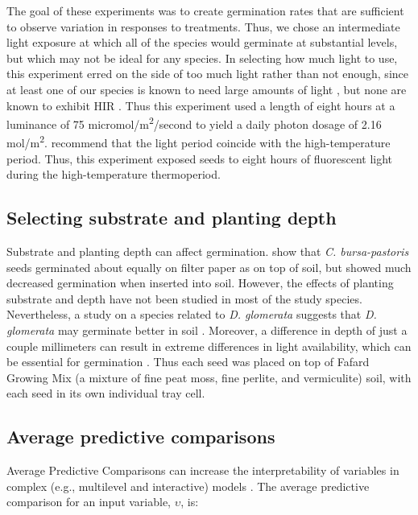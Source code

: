 \documentclass[12pt]{article}\usepackage[]{graphicx}\usepackage[]{color}
\begin{document}
	The goal of these experiments was to create germination rates that are sufficient to observe variation in responses to treatments. Thus, we chose an intermediate light exposure at which all of the species would germinate at substantial levels, but which may not be ideal for any species. In selecting how much light to use, this experiment erred on the side of too much light rather than not enough, since at least one of our species is known to need large amounts of light \parencite[\textit{Plantago major},][]{Pons1991}, but none are known to exhibit HIR \parencite[although a \textit{D. glomerata} subspecies in southern Europe does exhibit HIR, see][however, this subspecies is not thought to have been collected for this study]{Probert1986}. Thus this experiment used a length of eight hours at a luminance of 75 micromol/m\textsuperscript{2}/second to yield a daily photon dosage of 2.16 mol/m\textsuperscript{2}. \textcite{Baskin1998} recommend that the light period coincide with the high-temperature period. Thus, this experiment exposed seeds to eight hours of fluorescent light during the high-temperature thermoperiod. 
	
\subsection{Selecting substrate and planting depth} 
Substrate and planting depth can affect germination. \textcite{Popay1970} show that \textit{C. bursa-pastoris} seeds germinated about equally on filter paper as on top of soil, but showed much decreased germination when inserted into soil. However, the effects of planting substrate and depth have not been studied in most of the study species. Nevertheless, a study on a species related to \textit{D. glomerata} suggests that \textit{D. glomerata} may germinate better in soil \parencite{Andrews1974}. Moreover, a difference in depth of just a couple millimeters can result in extreme differences in light availability, which can be essential for germination \parencite{Tester1987}. Thus each seed was placed on top of Fafard Growing Mix (a mixture of fine peat moss, fine perlite, and vermiculite) soil, with each seed in its own individual tray cell.

\subsection{Average predictive comparisons} 
Average Predictive Comparisons can increase the interpretability of variables in complex (e.g., multilevel and interactive) models \parencite{Gelman2007}.  The average predictive comparison for an input variable, $\upsilon$, is: 
\end{document}
